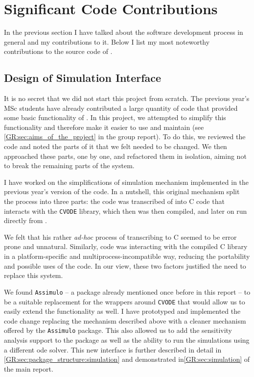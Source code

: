 \section{Significant Code Contributions}

In the previous section I have talked about the software development process in general and my contributions to it. 
Below I list my most noteworthy contributions to the source code of \means{}.

\subsection{Design of Simulation Interface}
\label{sec:simulation}

It is no secret that we did not start this project from scratch.
The previous year's MSc students have already contributed a large quantity of \py{} code that provided some basic functionality of \means{}. In this project, we attempted to simplify this functionality and therefore make it easier to use and maintain (see \autoref*{GR:sec:aims_of_the_project} in the group report).
To do this, we reviewed the code and noted the parts of it that we felt needed to be changed. 
We then approached these parts, one by one, and refactored them in isolation, aiming not to break the remaining parts of the system.

I have worked on the simplifications of simulation mechanism implemented in the previous year's version of the code. 
In a nutshell, this original mechanism split the process into three parts: the \python{} code was transcribed of into C code that interacts with the \verb"CVODE" library\cite{hindmarsh_sundials_2005}, which then was then compiled, and later on run directly from \py{}.

We felt that his rather \emph{ad-hoc} process of transcribing \py{} to C seemed to be error prone and unnatural. 
Similarly, \py{} code was interacting with the compiled C library in a platform-specific and multiprocess-incompatible way, reducing the portability and possible uses of the code. In our view, these two factors justified the need to replace this system.

We found \verb"Assimulo" -- a package already mentioned once before in this report -- to be a suitable replacement for the wrappers around \verb"CVODE" that would allow us to easily extend the functionality as well. 
I have prototyped and implemented the code change replacing the mechanism described above with a cleaner mechanism offered by the \verb"Assimulo" package. This also allowed us to add the sensitivity analysis support to the \means{} package as well as the ability to run the simulations using a different \gls{ode} solver.
This new interface is further described in detail in \autoref*{GR:sec:package_structure:simulation} and demonstrated in\autoref*{GR:sec:simulation} of the main report.

